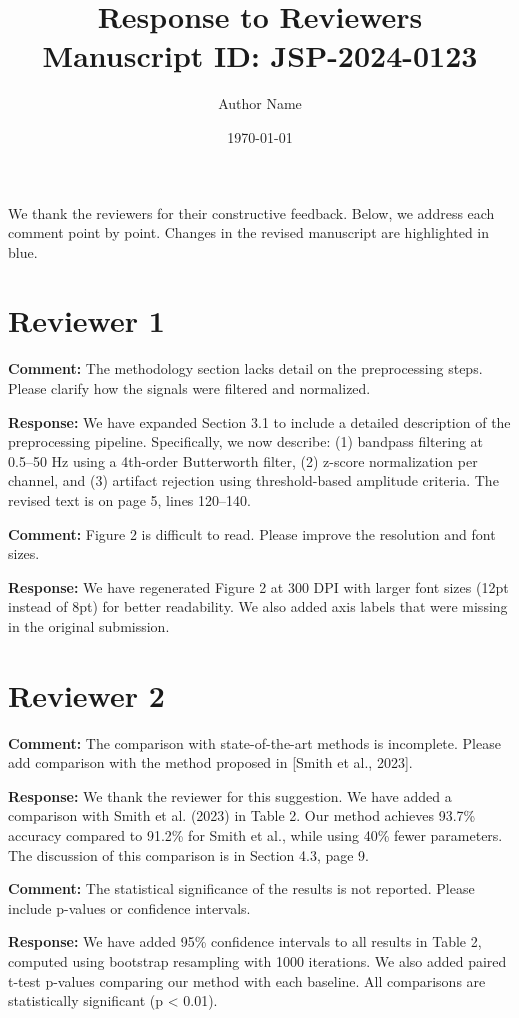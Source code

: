 \documentclass[11pt, a4paper]{article}
\newcommand{\reviewer}[1]{\section*{Reviewer #1}}
\newcommand{\comment}[1]{\noindent\textbf{Comment:} #1\par}
\newcommand{\response}[1]{\noindent\textbf{Response:} #1\par\vspace{1em}}
\begin{document}
\title{Response to Reviewers\\[0.5em]
\large Manuscript ID: JSP-2024-0123}
\author{Author Name}
\date{\today}
\maketitle

We thank the reviewers for their constructive feedback.
Below, we address each comment point by point.
Changes in the revised manuscript are highlighted in blue.

\reviewer{1}

\comment{The methodology section lacks detail on the
preprocessing steps. Please clarify how the signals
were filtered and normalized.}

\response{We have expanded Section 3.1 to include a
detailed description of the preprocessing pipeline.
Specifically, we now describe: (1) bandpass filtering
at 0.5--50 Hz using a 4th-order Butterworth filter,
(2) z-score normalization per channel, and (3) artifact
rejection using threshold-based amplitude criteria.
The revised text is on page 5, lines 120--140.}

\comment{Figure 2 is difficult to read. Please improve
the resolution and font sizes.}

\response{We have regenerated Figure 2 at 300 DPI with
larger font sizes (12pt instead of 8pt) for better
readability. We also added axis labels that were
missing in the original submission.}

\reviewer{2}

\comment{The comparison with state-of-the-art methods
is incomplete. Please add comparison with the method
proposed in [Smith et al., 2023].}

\response{We thank the reviewer for this suggestion.
We have added a comparison with Smith et al. (2023)
in Table 2. Our method achieves 93.7\% accuracy
compared to 91.2\% for Smith et al., while using
40\% fewer parameters. The discussion of this
comparison is in Section 4.3, page 9.}

\comment{The statistical significance of the results
is not reported. Please include p-values or confidence
intervals.}

\response{We have added 95\% confidence intervals to
all results in Table 2, computed using bootstrap
resampling with 1000 iterations. We also added
paired t-test p-values comparing our method with
each baseline. All comparisons are statistically
significant (p < 0.01).}
\end{document}

